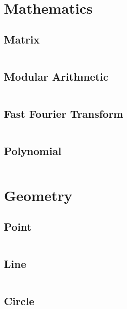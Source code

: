 \documentclass[8pt,a4paper,landscape,oneside]{amsart}
\begin{document}
\begin{multicols*}{2}
	\section{Mathematics}
	\begin{multicols*}{2}
		\subsection{Matrix}
		\inputminted[firstline=18,lastline=67]{c++}{_code/maths/matrix.cpp}
		\vfill\null
		\columnbreak
		\subsection{Modular Arithmetic}
		\inputminted[firstline=15,lastline=40]{c++}{_code/maths/mod.cpp}
		\subsection{Fast Fourier Transform}
		\inputminted[firstline=20,lastline=29]{c++}{_code/maths/polynomial.cpp}
		\vfill\null
	\end{multicols*}
	\vfill\null
	\newpage
	\begin{multicols*}{2}
		\subsection{Polynomial}
		\inputminted[firstline=33,lastline=87]{c++}{_code/maths/polynomial.cpp}
		\columnbreak
		\vfill\null
	\end{multicols*}
	\columnbreak
	\section{Geometry}
	\begin{multicols*}{2}
		\subsection{Point}
		\inputminted[firstline=23,lastline=48]{c++}{_code/geometry/point.cpp}
		\subsection{Line}
		\inputminted[firstline=24,lastline=47]{c++}{_code/geometry/line.cpp}
		\vfill\null
		\columnbreak
		\subsection{Circle}
		\inputminted[firstline=25,lastline=69]{c++}{_code/geometry/circ.cpp}
		\vfill\null
	\end{multicols*}
	\end{multicols*}
\end{document}
